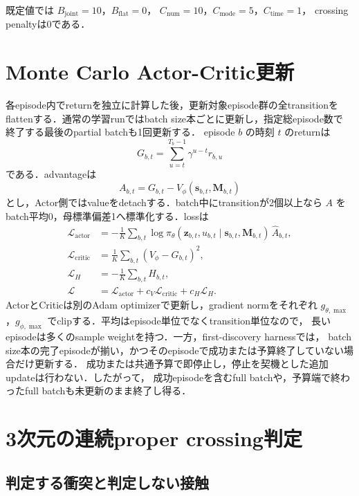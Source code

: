 \documentclass[a4paper,11pt]{ltjsarticle}
\begin{document}
既定値では $B_{\mathrm{joint}}=10$，$B_{\mathrm{flat}}=0$，
$C_{\mathrm{num}}=10$，$C_{\mathrm{mode}}=5$，$C_{\mathrm{time}}=1$，
crossing penaltyは0である．

\section{Monte Carlo Actor-Critic更新}

各episode内でreturnを独立に計算した後，更新対象episode群の全transitionを
flattenする．通常の学習runではbatch size本ごとに更新し，指定総episode数で
終了する最後のpartial batchも1回更新する．
episode $b$ の時刻 $t$ のreturnは
\begin{equation}
  G_{b,t}=\sum_{u=t}^{T_b-1}\gamma^{u-t}r_{b,u}
\end{equation}
である．advantageは
\begin{equation}
  A_{b,t}=G_{b,t}-V_\phi(\bm s_{b,t},\bm M_{b,t})
\end{equation}
とし，Actor側ではvalueをdetachする．batch中にtransitionが2個以上なら
$A$ をbatch平均0，母標準偏差1へ標準化する．lossは
\begin{align}
 \mathcal L_{\mathrm{actor}}
 &=-\frac1K\sum_{b,t}\log\pi_\theta(\bm z_{b,t},u_{b,t}\mid
 \bm s_{b,t},\bm M_{b,t})\,\widehat A_{b,t},\\
 \mathcal L_{\mathrm{critic}}
 &=\frac1K\sum_{b,t}\left(V_\phi-G_{b,t}\right)^2,\\
 \mathcal L_H&=-\frac1K\sum_{b,t}H_{b,t},\\
 \mathcal L&=\mathcal L_{\mathrm{actor}}+c_V\mathcal L_{\mathrm{critic}}
 +c_H\mathcal L_H.
\end{align}
ActorとCriticは別のAdam optimizerで更新し，gradient normをそれぞれ
$g_{\theta,\max}$，$g_{\phi,\max}$ でclipする．平均はepisode単位でなくtransition単位なので，
長いepisodeは多くのsample weightを持つ．一方，first-discovery harnessでは，
batch size本の完了episodeが揃い，かつそのepisodeで成功または予算終了していない場合だけ更新する．
成功または共通予算で即停止し，停止を契機とした追加updateは行わない．したがって，
成功episodeを含むfull batchや，予算端で終わったfull batchも未更新のまま終了し得る．

\section{3次元の連続proper crossing判定}
\label{sec:collision}

\subsection{判定する衝突と判定しない接触}
\end{document}
